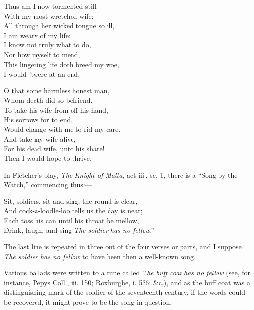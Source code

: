 \begin{dcverse}
\begin{altverse}
Thus am I now tormented still\\
With my most wretched wife;\\
All through her wicked tongue so ill,\\
I am weary of my life:\\
I know not truly what to do,\\
Nor how myself to mend,\\
This lingering life doth breed my woe,\\
I would ’twere at an end.
\end{altverse}

\begin{altverse}
O that some harmless honest man,\\
Whom death did so befriend.\\
To take his wife from off his hand,\\
His sorrows for to end,\\
Would change with me to rid my care.\\
And take my wife alive,\\
For his dead wife, unto his share!\\
Then I would hope to thrive.
\end{altverse}
\end{dcverse}


In Fletcher’s play, \textit{The Knight of Malta}, act iii., sc. 1, there is a “Song by
the Watch,” commencing thus:—
\settowidth{\versewidth}{Sit, soldiers, sit and sing, the round is clear,}
\begin{scverse}
Sit, soldiers, sit and sing, the round is clear,\\
And cock-a-loodle-loo tells us the day is near;\\
Each toss his can until his throat be mellow,\\
Drink, laugh, and sing \textit{The soldier has no fellow}.”
\end{scverse}

The last line is repeated in three out of the four verses or parts, and I suppose
\textit{The soldier has no fellow} to have been then a well-known song.
\pagebreak

Various ballads were written to a tune called \textit{The buff coat has no fellow} (see,
for instance, Pepys Coll., iii. 150; Roxburghe, i. 536; \&c.), and as the buff
coat was a distinguishing mark of the soldier of the seventeenth century, if the
words could be recovered, it might prove to be the song in question.

